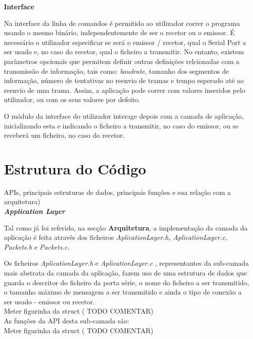 \documentclass[a4paper]{article}
\begin{document}
\large\textbf{Interface}\\
\normalsize

Na interface da linha de comandos é permitido ao utilizador correr o programa usando o mesmo binário, independentemente de ser o recetor ou o emissor.
É necessário o utilizador especificar se será o emissor / recetor, qual o Serial Port a ser usado e, no caso do recetor, qual o ficheiro a transmitir. No entanto, existem parâmetros opcionais que permitem definir outras definições relcionadas com a transmissão de informação, tais como: \textit{baudrate}, tamanho dos segmentos de informação, número de tentativas no reenvio de tramas e tempo esperado até ao reenvio de uma trama.
Assim, a aplicação pode correr com valores inseridos pelo utilizador, ou com os seus valores por defeito.

O módulo da interface do utilizador interage depois com a camada de aplicação, inicializando esta e indicando o ficheiro a transmitir, no caso do emissor, ou se receberá um ficheiro, no caso do recetor.

\newpage

\section{Estrutura do Código}

APIs, principais estruturas de dados, principais funções e sua relação com a arquitetura)\\

\large\textbf{\textit{Application Layer}}\\
\normalsize

Tal como já foi referido, na secção \textbf{Arquitetura}, a implementação da camada da aplicação é feita através dos ficheiros \textit{AplicationLayer.h, AplicationLayer.c, Packets.h} e \textit{Packets.c}.

Os ficheiros \textit{AplicationLayer.h} e \textit{AplicationLayer.c} , representantes da sub-camada mais abstrata da camada da aplicação, fazem uso de uma estrutura de dados que guarda o descritor do ficheiro da porta série, o nome do ficheiro a ser transmitido, o tamanho máximo de mensagem a ser transmitido e ainda o tipo de conexão a ser usado - emissor ou recetor.\\
Meter figurinha da struct ( TODO COMENTAR)\\

As funções da API desta sub-camada são:\\
Meter figurinha da struct ( TODO COMENTAR)\\
\end{document}
